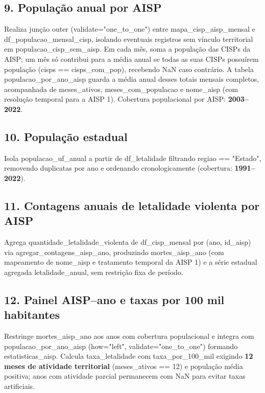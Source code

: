 \documentclass[11pt,a4paper]{article}
\newcommand{\code}[1]{{\ttfamily\footnotesize\allowbreak #1}}
\begin{document}
\subsection{9. População anual por AISP}
Realiza junção \code{outer} (\code{validate="one\_to\_one"}) entre \code{mapa\_cisp\_aisp\_mensal} e \code{df\_populacao\_mensal\_cisp}, isolando eventuais registros sem vínculo territorial em \code{populacao\_cisp\_sem\_aisp}. Em cada mês, soma a população das CISPs da AISP; um mês só contribui para a média anual se todas as suas CISPs possuírem população (\code{cisps == cisps\_com\_pop}), recebendo \code{NaN} caso contrário. A tabela \code{populacao\_por\_ano\_aisp} guarda a média anual desses totais mensais completos, acompanhada de \code{meses\_ativos}, \code{meses\_com\_populacao} e \code{nome\_aisp} (com resolução temporal para a AISP 1). Cobertura populacional por AISP: \textbf{2003--2022}.

\subsection{10. População estadual}
Isola \code{populacao\_uf\_anual} a partir de \code{df\_letalidade} filtrando \code{regiao == "Estado"}, removendo duplicatas por \code{ano} e ordenando cronologicamente (cobertura: \textbf{1991--2022}).

\subsection{11. Contagens anuais de letalidade violenta por AISP}
Agrega \code{quantidade\_letalidade\_violenta} de \code{df\_cisp\_mensal} por \code{(ano, id\_aisp)} via \code{agregar\_contagens\_aisp\_ano}, produzindo \code{mortes\_aisp\_ano} (com mapeamento de \code{nome\_aisp} e tratamento temporal da AISP 1) e a série estadual agregada \code{letalidade\_anual}, sem restrição fixa de período.

\subsection{12. Painel AISP--ano e taxas por 100 mil habitantes}
Restringe \code{mortes\_aisp\_ano} aos anos com cobertura populacional e integra com \code{populacao\_por\_ano\_aisp} (\code{how="left", validate="one\_to\_one"}) formando \code{estatisticas\_aisp}. Calcula \code{taxa\_letalidade} com \code{taxa\_por\_100\_mil} exigindo \textbf{12 meses de atividade territorial} (\code{meses\_ativos == 12}) e população média positiva; anos com atividade parcial permanecem com \code{NaN} para evitar taxas artificiais.
\end{document}
